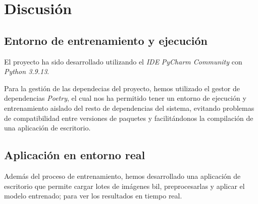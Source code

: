 \section{Discusión}

\subsection{Entorno de entrenamiento y ejecución}

El proyecto ha sido desarrollado utilizando el \textit{IDE} \textit{PyCharm Community} con \textit{Python 3.9.13}.

Para la gestión de las dependecias del proyecto, hemos utilizado el gestor de dependencias \textit{Poetry}, el cual nos ha permitido tener un entorno de ejecución y entrenamiento aislado del resto de dependencias del sistema, evitando problemas de compatibilidad entre versiones de paquetes y facilitándonos la compilación de una aplicación de escritorio.




\subsection{Aplicación en entorno real}

Además del proceso de entrenamiento, hemos desarrollado una aplicación de escritorio que permite cargar lotes de imágenes \gls{bil}, preprocesarlas y aplicar el modelo entrenado; para ver los resultados en tiempo real.
